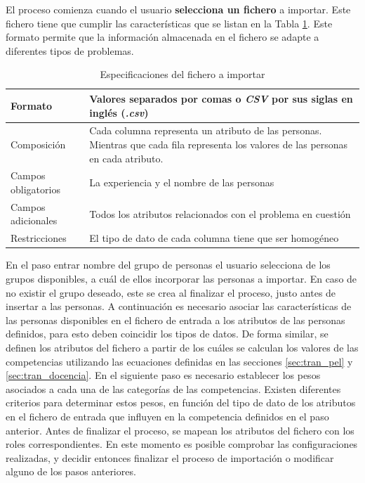 El proceso comienza cuando el usuario \textbf{selecciona un fichero} a importar. Este fichero tiene que cumplir las características que se listan en la Tabla \ref{table:especificaciones-fichero}. Este formato permite que la información almacenada en el fichero se adapte a diferentes tipos de problemas.

\begin{table}[H]
	\centering
	\caption{Especificaciones del fichero a importar}\label{table:especificaciones-fichero}
	\begin{tabular} {l | p{10cm}}
		\toprule
		Formato & Valores separados por comas o \textit{CSV} por sus siglas en inglés (\textit{.csv}) \\ \midrule
		Composición & Cada columna representa un atributo de las personas. Mientras que cada fila representa los valores de las personas en cada atributo. \\ \hline
		Campos obligatorios & La experiencia y el nombre de las personas \\ \hline
		Campos adicionales & Todos los atributos relacionados con el problema en cuestión \\ \hline 
		Restricciones & El tipo de dato de cada columna tiene que ser homogéneo \\ \bottomrule
	\end{tabular}
\end{table}

En el paso entrar nombre del grupo de personas el usuario selecciona de los grupos disponibles, a cuál de ellos incorporar las personas a importar. En caso de no existir el grupo deseado, este se crea al finalizar el proceso, justo antes de insertar a las personas. A continuación es necesario asociar las características de las personas disponibles en el fichero de entrada a los atributos de las personas definidos, para esto deben coincidir los tipos de datos. De forma similar, se definen los atributos del fichero a partir de los cuáles se calculan los valores de las competencias utilizando las ecuaciones definidas en las secciones \ref{sec:tran_pel} y \ref{sec:tran_docencia}. En el siguiente paso es necesario establecer los pesos asociados a cada una de las categorías de las competencias. Existen diferentes criterios para determinar estos pesos, en función del tipo de dato de los atributos en el fichero de entrada que influyen en la competencia definidos en el paso anterior. Antes de finalizar el proceso, se mapean los atributos del fichero con los roles correspondientes. En este momento es posible comprobar las configuraciones realizadas, y decidir entonces finalizar el proceso de importación o modificar alguno de los pasos anteriores. \\

